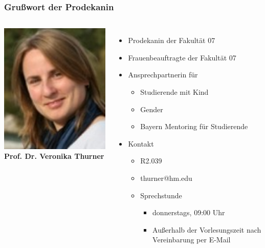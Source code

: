 \documentclass{beamer}
\begin{document}
    \begin{frame} %
    	\frametitle{Grußwort der Prodekanin}
    	\begin{columns}
    		\includegraphics[width=1.0\textwidth]{Prof_Thurner.jpg}
    		\textbf{Prof. Dr. Veronika Thurner}
    		\begin{itemize}
    			\item Prodekanin der Fakultät 07
    			\item Frauenbeauftragte der Fakultät 07
    			\item Ansprechpartnerin für
    			\begin{itemize}
    				\item Studierende mit Kind
    				\item Gender
    				\item Bayern Mentoring für Studierende
    			\end{itemize}
    			\bigskip
    			\item Kontakt
    			\begin{itemize}
    				\item R2.039
    				\item thurner@hm.edu
    				\item Sprechstunde
    				\begin{itemize}
    					\item donnerstags, 09:00 Uhr
    					\item Außerhalb der Vorlesungszeit nach Vereinbarung per E-Mail
    				\end{itemize}
    			\end{itemize}
    		\end{itemize}
    	\end{columns}
    \end{frame}
    
\end{document}

